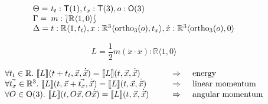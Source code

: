 \documentclass[xetex,serif,mathserif]{beamer}
\newcommand{\sem}[1]{\llbracket #1 \rrbracket}
\newenvironment{slide}[1]{\begin{frame}\frametitle{#1}}{\end{frame}}
\begin{document}
\begin{slide}{}
  \begin{displaymath}
    \begin{array}{l@{\hspace{0.3em}}l}
      \Theta = & t_t : \mathsf{T}(1), t_x : \mathsf{T}(3), o : \mathsf{O}(3) \\
      \Gamma = & m : \typeOfCartSp{\mathbb{R}\langle 1, 0 \rangle} \\
      \Delta = & t : \mathbb{R}\langle 1, t_t \rangle, x : \mathbb{R}^3\langle \mathrm{ortho}_3(o), t_x \rangle, \dot{x} : \mathbb{R}^3\langle \mathrm{ortho}_3(o), 0 \rangle
    \end{array}
  \end{displaymath}

  \bigskip

  \begin{displaymath}
    L = \frac{1}{2}m(\dot{x} \cdot \dot{x}) : \mathbb{R}\langle 1, 0 \rangle
  \end{displaymath}

  \pause
  \bigskip

  \begin{displaymath}
    \begin{array}{l@{\hspace{1cm}}@{\Rightarrow}@{\hspace{0.5cm}}l}
      \forall t_t \in \mathbb{R}.~\sem{L}(t + t_t, \vec{x}, \dot{\vec{x}}) = \sem{L}(t, \vec{x}, \dot{\vec{x}})
      &
      \textrm{energy}
      \\
      \forall \vec{t_x} \in \mathbb{R}^3.~\sem{L}(t, \vec{x} + \vec{t_x}, \dot{\vec{x}}) = \sem{L}(t, \vec{x}, \dot{\vec{x}})
      &
      \textrm{linear momentum}
      \\
      \forall O \in \mathrm{O}(3).~\sem{L}(t, O\vec{x}, O\dot{\vec{x}}) = \sem{L}(t, \vec{x}, \dot{\vec{x}})
      &
      \textrm{angular momentum}
    \end{array}
  \end{displaymath}
\end{slide}
\end{document}
